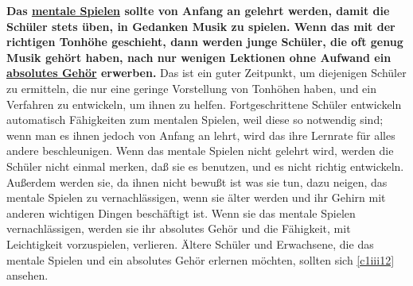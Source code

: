 \textbf{Das \hyperref[c1ii12mental]{mentale Spielen} sollte von Anfang an gelehrt werden, damit die Schüler stets üben, in Gedanken Musik zu spielen.
Wenn das mit der richtigen Tonhöhe geschieht, dann werden junge Schüler, die oft genug Musik gehört haben, nach nur wenigen Lektionen ohne Aufwand ein \hyperref[c1iii12]{absolutes Gehör} erwerben.}
Das ist ein guter Zeitpunkt, um diejenigen Schüler zu ermitteln, die nur eine geringe Vorstellung von Tonhöhen haben, und ein Verfahren zu entwickeln, um ihnen zu helfen.
Fortgeschrittene Schüler entwickeln automatisch Fähigkeiten zum mentalen Spielen, weil diese so notwendig sind; wenn man es ihnen jedoch von Anfang an lehrt, wird das ihre Lernrate für alles andere beschleunigen.
Wenn das mentale Spielen nicht gelehrt wird, werden die Schüler nicht einmal merken, daß sie es benutzen, und es nicht richtig entwickeln.
Außerdem werden sie, da ihnen nicht bewußt ist was sie tun, dazu neigen, das mentale Spielen zu vernachlässigen, wenn sie älter werden und ihr Gehirn mit anderen wichtigen Dingen beschäftigt ist.
Wenn sie das mentale Spielen vernachlässigen, werden sie ihr absolutes Gehör und die Fähigkeit, mit Leichtigkeit vorzuspielen, verlieren.
Ältere Schüler und Erwachsene, die das mentale Spielen und ein absolutes Gehör erlernen möchten, sollten sich \hyperref[c1iii12]{\autoref{c1iii12}} ansehen.



